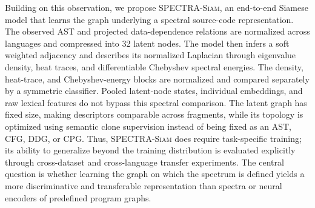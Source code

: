 \documentclass[authoryear,final,5p,times,twocolumn]{elsarticle}
\newcommand{\method}{\textsc{SPECTRA-Siam}}
\newcommand{\added}[1]{{\color{green!50!black}#1}}
\theoremstyle{plain}
\begin{document}
\added{Building on this observation, we propose \method{}, an end-to-end
Siamese model that learns the graph underlying a spectral source-code
representation. The observed AST and projected data-dependence relations are
normalized across languages and compressed into 32 latent nodes. The model then
infers a soft weighted adjacency and describes its normalized Laplacian through
eigenvalue density, heat traces, and differentiable Chebyshev spectral energies.
The density, heat-trace, and Chebyshev-energy blocks are normalized and compared
separately by a symmetric classifier. Pooled latent-node states, individual
embeddings, and raw lexical features do not bypass this spectral comparison.
The latent graph has fixed size, making descriptors comparable
across fragments, while its topology is optimized using semantic clone
supervision instead of being fixed as an AST, CFG, DDG, or CPG. Thus,
\method{} does require task-specific training; its ability to generalize beyond
the training distribution is evaluated explicitly through cross-dataset and
cross-language transfer experiments. The central question is whether learning
the graph on which the spectrum is defined yields a more discriminative and
transferable representation than spectra or neural encoders of predefined
program graphs.}

\end{document}
